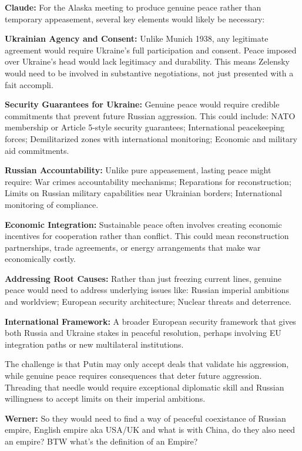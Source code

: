 \documentclass[11pt,a5paper]{scrartcl}
\begin{document}
\begin{claudebox}
\textbf{Claude:} For the Alaska meeting to produce genuine peace rather than temporary appeasement, several key elements would likely be necessary:

\textbf{Ukrainian Agency and Consent:} Unlike Munich 1938, any legitimate agreement would require Ukraine's full participation and consent. Peace imposed over Ukraine's head would lack legitimacy and durability. This means Zelensky would need to be involved in substantive negotiations, not just presented with a fait accompli.

\textbf{Security Guarantees for Ukraine:} Genuine peace would require credible commitments that prevent future Russian aggression. This could include: NATO membership or Article 5-style security guarantees; International peacekeeping forces; Demilitarized zones with international monitoring; Economic and military aid commitments.

\textbf{Russian Accountability:} Unlike pure appeasement, lasting peace might require: War crimes accountability mechanisms; Reparations for reconstruction; Limits on Russian military capabilities near Ukrainian borders; International monitoring of compliance.

\textbf{Economic Integration:} Sustainable peace often involves creating economic incentives for cooperation rather than conflict. This could mean reconstruction partnerships, trade agreements, or energy arrangements that make war economically costly.

\textbf{Addressing Root Causes:} Rather than just freezing current lines, genuine peace would need to address underlying issues like: Russian imperial ambitions and worldview; European security architecture; Nuclear threats and deterrence.

\textbf{International Framework:} A broader European security framework that gives both Russia and Ukraine stakes in peaceful resolution, perhaps involving EU integration paths or new multilateral institutions.

The challenge is that Putin may only accept deals that validate his aggression, while genuine peace requires consequences that deter future aggression. Threading that needle would require exceptional diplomatic skill and Russian willingness to accept limits on their imperial ambitions.
\end{claudebox}

\begin{humanbox}
\textbf{Werner:} So they would need to find a way of peaceful coexistance of Russian empire, English empire aka USA/UK and what is with China, do they also need an empire?
BTW what's the definition of an Empire?
\end{humanbox}
\end{document}
